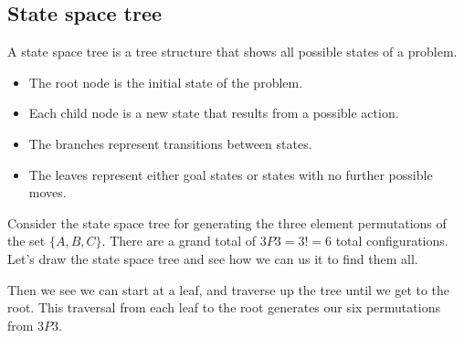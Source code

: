 \documentclass{report}
\begin{document}
\subsection{State space tree}
\bigbreak \noindent 
A state space tree is a tree structure that shows all possible states of a problem.
\begin{itemize}
    \item The root node is the initial state of the problem.
    \item Each child node is a new state that results from a possible action.
    \item The branches represent transitions between states.
    \item The leaves represent either goal states or states with no further possible moves.
\end{itemize}
\bigbreak \noindent 
Consider the state space tree for generating the three element permutations of the set $\{A,B,C\}$. There are a grand total of $3P3 = 3! = 6$ total configurations. Let's draw the state space tree and see how we can us it to find them all.
\bigbreak \noindent 
\begin{figure}[ht]
    \centering
    \label{fig:statespace2}
\end{figure}
\bigbreak \noindent 
Then we see we can start at a leaf, and traverse up the tree until we get to the root. This traversal from each leaf to the root generates our six permutations from $3P3$.

\pagebreak \bigbreak \noindent 
\end{document}
